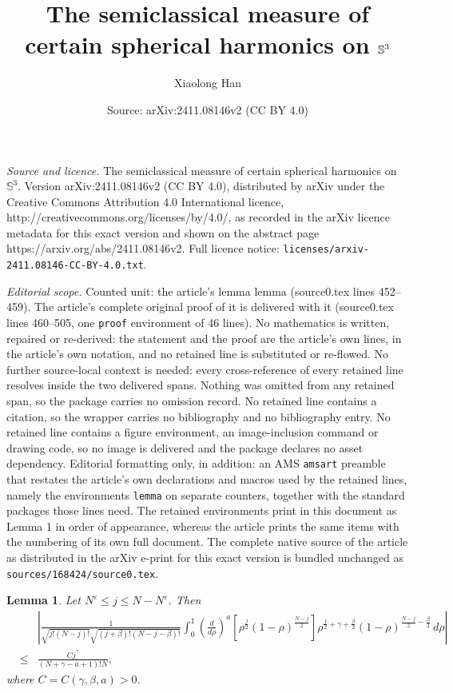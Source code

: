 \documentclass[10pt,a4paper]{amsart}
\title{The semiclassical measure of certain spherical harmonics on $\Sb^3$}
\author{Xiaolong Han}
\date{Source: arXiv:2411.08146v2 (CC BY 4.0)}
\newcommand\Sb{\mathbb{S}}
\newtheorem{lemma}{Lemma}
\newcommand\ve{\varepsilon}
\begin{document}
\maketitle

\noindent\emph{Source and licence.} The semiclassical measure of certain spherical harmonics on $\Sb^3$. Version arXiv:2411.08146v2 (CC BY 4.0), distributed by arXiv under the Creative Commons Attribution 4.0 International licence, http://creativecommons.org/licenses/by/4.0/, as recorded in the arXiv licence metadata for this exact version and shown on the abstract page https://arxiv.org/abs/2411.08146v2. Full licence notice: \texttt{licenses/arxiv-2411.08146-CC-BY-4.0.txt}.\par\smallskip

\noindent\textit{Editorial scope.} Counted unit: the article's lemma lemma (source0.tex lines 452--459). The article's complete original proof of it is delivered with it (source0.tex lines 460--505, one \texttt{proof} environment of 46 lines). No mathematics is written, repaired or re-derived: the statement and the proof are the article's own lines, in the article's own notation, and no retained line is substituted or re-flowed.  No further source-local context is needed: every cross-reference of every retained line resolves inside the two delivered spans.  Nothing was omitted from any retained span, so the package carries no omission record.  No retained line contains a citation, so the wrapper carries no bibliography and no bibliography entry.  No retained line contains a figure environment, an image-inclusion command or drawing code, so no image is delivered and the package declares no asset dependency.  Editorial formatting only, in addition: an AMS \texttt{amsart} preamble that restates the article's own declarations and macros used by the retained lines, namely the environments \texttt{lemma} on separate counters, together with the standard packages those lines need.  The retained environments print in this document as Lemma 1 in order of appearance, whereas the article prints the same items with the numbering of its own full document.  The complete native source of the article as distributed in the arXiv e-print for this exact version is bundled unchanged as \texttt{sources/168424/source0.tex}.
\begin{lemma}
Let $N^\ve\le j\le N-N^\ve$. Then
\begin{eqnarray*}
&&\left|\frac{1}{\sqrt{j!(N-j)!}\sqrt{(j+\beta)!(N-j-\beta)!}}\int_0^1\left(\frac{d}{d\rho}\right)^a\left[\rho^\frac j2(1-\rho)^{\frac{N-j}{2}}\right]\rho^{\frac j2+\gamma+\frac\beta2}(1-\rho)^{\frac{N-j}{2}-\frac\beta2}\,d\rho\right|\\
&\le&\frac{Cj^\gamma}{(N+\gamma-a+1)!N},
\end{eqnarray*}
where $C=C(\gamma,\beta,a)>0$.
\end{lemma}
\end{document}

